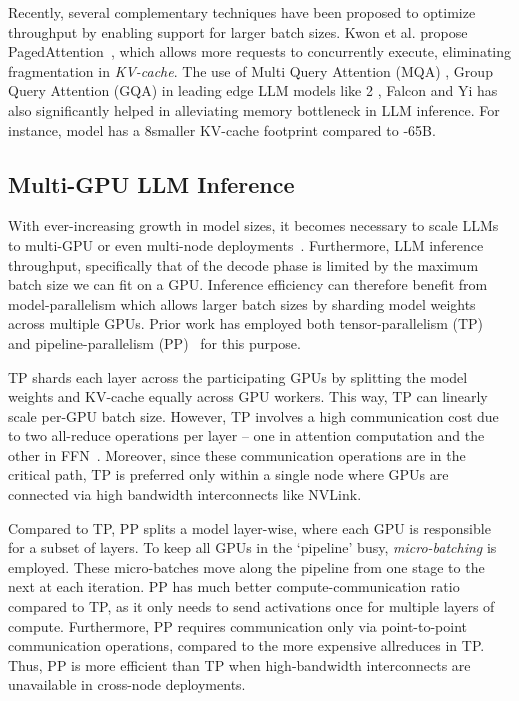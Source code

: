 Recently, several complementary techniques have been proposed to optimize throughput by enabling support for larger batch sizes. Kwon et al.  propose PagedAttention~\cite{vllmsosp}, which allows more requests to concurrently execute, eliminating fragmentation in \textit{KV-cache}. The use of Multi Query Attention (MQA) \cite{multiqueryattention}, Group Query Attention (GQA) \cite{groupedqueryattention} in leading edge LLM models like \llama{}2 \cite{touvron2023llama}, Falcon \cite{almazrouei2023falcon} and Yi \cite{yi} has also significantly helped in alleviating memory bottleneck in LLM inference. For instance, \llamaL model has a 8\myx smaller KV-cache footprint compared to \llama-65B.





\subsection{Multi-GPU LLM Inference}
\label{sec:background_multi_GPU_inference}
With ever-increasing growth in model sizes, it becomes necessary to scale LLMs to multi-GPU or even multi-node deployments~\cite{efficiently-scaling-transformer-inference,multinodeinferenceblog}. Furthermore, LLM inference throughput, specifically that of the decode phase is limited by the maximum batch size we can fit on a GPU. Inference efficiency can therefore benefit from model-parallelism which allows larger batch sizes by sharding model weights across multiple GPUs. Prior work has employed both tensor-parallelism (TP)~\cite{megatron} and pipeline-parallelism (PP)~\cite{orca, fastertransformer, fastserve} for this purpose.


TP shards each layer across the participating GPUs by splitting the model weights and KV-cache equally across GPU workers. This way, TP can linearly scale per-GPU batch size. However, TP involves a high communication cost due to two all-reduce operations per layer -- one in attention computation and the other in FFN~\cite{megatron}. Moreover, since these communication operations are in the critical path, TP is preferred only within a single node where GPUs are connected via high bandwidth interconnects like NVLink.


Compared to TP, PP splits a model layer-wise, where each GPU is responsible for a subset of layers. To keep all GPUs in the `pipeline' busy, \textit{micro-batching} is employed. These micro-batches move along the pipeline from one stage to the next at each iteration. PP has much better compute-communication ratio compared to TP, as it only needs to send activations once for multiple layers of compute. Furthermore, PP requires communication only via point-to-point communication operations, compared to the more expensive allreduces in TP. Thus, PP is more efficient than TP when high-bandwidth interconnects are unavailable \eg in cross-node deployments.



